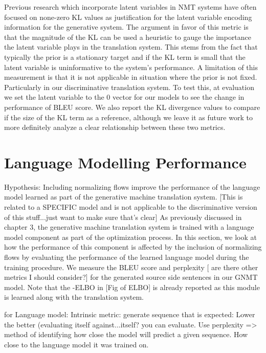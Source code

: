 Previous research which incorporate latent variables in \ac{NMT} systems have often focused on none-zero KL values as justification for the latent variable encoding information for the generative system. The argument in favor of this metric is that the magnitude of the KL can be used a heuristic to gauge the importance the latent variable plays in the translation system. This stems from the fact that typically the prior is a stationary target and if the KL term is small that the latent variable is uninformative to the system's performance. A limitation of this measurement is that it is not applicable in situation where the prior is not fixed. Particularly in our discriminative translation system.
 To test this, at evaluation we set the latent variable to the 0 vector for our models to see the change in performance of BLEU score. We also report the KL divergence values to compare if the size of the KL term as a reference, although we leave it as future work to more definitely analyze a clear relationship between these two metrics. 

\section{Language Modelling Performance}

Hypothesis: Including normalizing flows improve the performance of the language model learned as part of the generative machine translation system. [This is related to a SPECIFIC model and is not applicable to the discriminative version of this stuff...just want to make sure that's clear]
As previously discussed in chapter 3, the generative machine translation system is trained with a language model component as part of the optimization process. In this section, we look at how the performance of this component is affected by the inclusion of normalizing flows by evaluating the performance of the learned language model during the training procedure. We measure the BLEU score and perplexity  [ are there other metrics I should consider?] for the generated source side sentences in our GNMT model. Note that the -ELBO in [Fig of ELBO] is already reported as this module is learned along with the translation system.

for Language model:
Intrinsic metric: generate sequence that is expected: Lower the better (evaluating itself against...itself? you can evaluate. Use perplexity => method of identifying how close the model will predict a given sequence. How close to the language model it was trained on. 


